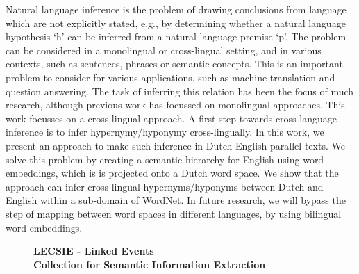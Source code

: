 \documentclass[10pt, a4paper, twopage, headinclude, footinclude, BCOR5mm]{book}
\begin{document}
\begin{table}[t!]
\end{table} 
\noindent
Natural language inference is the problem of drawing conclusions from language which are not explicitly stated, e.g., by determining whether a natural language hypothesis `h' can be inferred from a natural language premise `p'. The problem can be considered in a monolingual or cross-lingual setting, and in various contexts, such as sentences, phrases or semantic concepts. This is an important problem to consider for various applications, such as machine translation and question answering. The task of inferring this relation has been the focus of much research, although previous work has focussed on monolingual approaches. This work focusses on a cross-lingual approach. A first step towards cross-language inference is to infer hypernymy/hyponymy cross-lingually. In this work, we present an approach to make such inference in Dutch-English parallel texts.  We solve this problem by creating a semantic hierarchy for English using word embeddings, which is is projected onto a Dutch word space. We show that the approach can infer cross-lingual hypernyms/hyponyms between Dutch and English within a sub-domain of WordNet. In future research, we will bypass the step of mapping between word spaces in different languages, by using bilingual word embeddings.  

\newpage

\begin{figure}[t!]
\centering
\large\textbf{LECSIE - Linked Events \\ Collection for Semantic Information Extraction}
\vspace*{0.5cm}
\end{figure}
\end{document}
